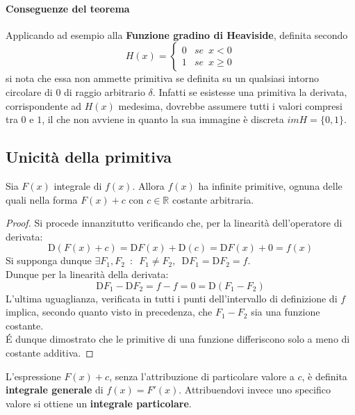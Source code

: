 \documentclass[10pt]{article}
\theoremstyle{plain}
\begin{document}
\paragraph{Conseguenze del teorema}
Applicando ad esempio alla \textbf{Funzione gradino di Heaviside}, definita secondo
\[H(x) = \begin{cases}
    0 & se \enspace x < 0\\
    1 & se \enspace x \geq 0
\end{cases}\]
si nota che essa non ammette primitiva se definita su un qualsiasi intorno circolare di $0$ di raggio arbitrario $\delta$. Infatti se esistesse una primitiva la derivata, corrispondente ad $H(x)$ medesima, dovrebbe assumere tutti i valori compresi tra $0$ e $1$, il che non avviene in quanto la sua immagine è discreta $im H = \{0,1\}$.

\subsection{Unicità della primitiva}
\begin{prop}
    Sia $F(x)$ integrale di $f(x)$. Allora $f(x)$ ha infinite primitive, ognuna delle quali nella forma $F(x) + c$ con $c \in \mathbb{R}$ costante arbitraria.
\end{prop}
\begin{proof}
    Si procede innanzitutto verificando che, per la linearità dell'operatore di derivata:
    \[\textrm{D}(F(x) + c) = \textrm{D}F(x) + \textrm{D}(c) = \textrm{D}F(x) + 0 = f(x) \]
    Si supponga dunque $\exists F_1, F_2 \enspace : \enspace F_1 \neq F_2, \enspace \textrm{D}F_1 = \textrm{D}F_2 = f$.
    \\Dunque per la linearità della derivata:
    \[\textrm{D}F_1 - \textrm{D}F_2 = f - f = 0 = \textrm{D}(F_1 - F_2)\]
    L'ultima uguaglianza, verificata in tutti i punti dell'intervallo di definizione di $f$ implica, secondo quanto visto in precedenza, che $F_1 - F_2$ sia una funzione costante. 
    \\\'E dunque dimostrato che le \hypertarget{primitive}{primitive di una funzione differiscono solo a meno di costante additiva.}
\end{proof}

\begin{defin}
    L'espressione $F(x) + c$, senza l'attribuzione di particolare valore a $c$, è definita \textbf{integrale generale} di $f(x) = F'(x)$. Attribuendovi invece uno specifico valore si ottiene un \textbf{integrale particolare}.
\end{defin}
\end{document}
